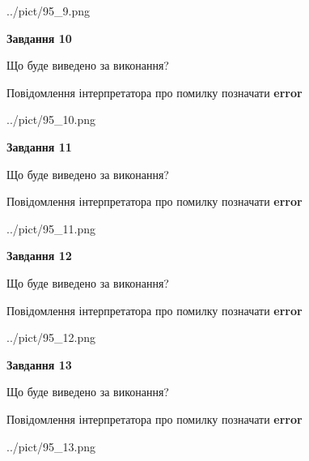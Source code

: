 \documentclass[11pt, ukrainian]{article}
\begin{document}
{\begin {large}
\begin{center}
	{../pict/95_9.png}
\end{center}
\newpage

{\begin {center}\textbf{Завдання 10}\end {center}}\par
Що буде виведено за виконання? \par
Повідомлення інтерпретатора про помилку позначати \textbf{error}

\begin{center}
	{../pict/95_10.png}
\end{center}
\newpage

{\begin {center}\textbf{Завдання 11}\end {center}}\par
Що буде виведено за виконання? \par
Повідомлення інтерпретатора про помилку позначати \textbf{error}

\begin{center}
	{../pict/95_11.png}
\end{center}
\newpage

{\begin {center}\textbf{Завдання 12}\end {center}}\par
Що буде виведено за виконання? \par
Повідомлення інтерпретатора про помилку позначати \textbf{error}

\begin{center}
	{../pict/95_12.png}
\end{center}
\newpage

{\begin {center}\textbf{Завдання 13}\end {center}}\par
Що буде виведено за виконання? \par
Повідомлення інтерпретатора про помилку позначати \textbf{error}

\begin{center}
	{../pict/95_13.png}
\end{center}
\newpage


\end{large}}
\end{document}
